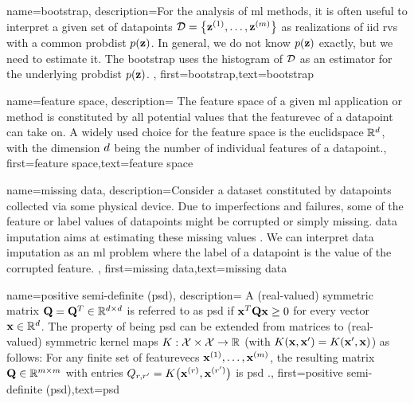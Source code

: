 {name={bootstrap},
	description={For the analysis of \gls{ml} methods, it is often useful to interpret 
		a given set of \gls{datapoint}s $\mathcal{D} = \big\{ {\bf z}^{(1)},\ldots,{\bf z}^{(m)}\big\}$ 
		as \gls{realization}s of \gls{iid} \gls{rv}s with a common \gls{probdist} $p({\bf z})$. In general, we 
		do not know $p({\bf z})$ exactly, but we need to estimate it. The bootstrap uses the 
		histogram of $\mathcal{D}$ as an estimator for the underlying \gls{probdist} $p({\bf z})$. 
	},
	first={bootstrap},text={bootstrap}  
}

{name={feature space},
	description={
		The \gls{feature} space of a given \gls{ml} application or method is 
		constituted by all potential values that the \gls{featurevec} of a \gls{datapoint} can 
		take on. A widely used choice for the \gls{feature} space is the \gls{euclidspace} $\mathbb{R}^{d}$, 
		with the dimension $d$ being the number of individual \gls{feature}s of a \gls{datapoint}.},
	first={feature space},text={feature space}  
}


{name={missing data},
	description={Consider a \gls{dataset} constituted by \gls{datapoint}s collected via 
		some physical \gls{device}. Due to imperfections and failures, some of the \gls{feature} 
		or \gls{label} values of \gls{datapoint}s might be corrupted or simply missing. 
		\Gls{data} imputation aims at estimating these missing values \cite{Abayomi2008DiagnosticsFM}. 
		We can interpret \gls{data} imputation as an \gls{ml} problem where the \gls{label} of a \gls{datapoint} is 
		the value of the corrupted \gls{feature}. },
	first={missing data},text={missing data}  
}


{name={positive semi-definite (psd)},
	description=
	{A (real-valued) symmetric matrix $\mathbf{Q} = \mathbf{Q}^{T} \in \mathbb{R}^{d \times d}$ 
	 is referred to as psd if ${\bf x}^{T} \mathbf{Q} {\bf x} \geq 0$ for every vector ${\bf x} \in \mathbb{R}^{d}$. 
	 The property of being psd can be extended from matrices to (real-valued) 
	 symmetric \gls{kernel} maps $K: \mathcal{X} \times \mathcal{X} \rightarrow \mathbb{R}$ 
	 (with $K({\bf x},{\bf x}') = K({\bf x}',{\bf x})$)
	 as follows: For any finite set of \gls{featurevec}s ${\bf x}^{(1)},\dots,{\bf x}^{(m)}$, 
	 the resulting matrix $\mathbf{Q} \in \mathbb{R}^{m \times m}$ with 
	entries $Q_{r,r'} = K\big({\bf x}^{(r)},{\bf x}^{(r')}\big)$ 
	is psd \cite{LearningKernelsBook}.},
	first={positive semi-definite (psd)},text={psd}  
}

